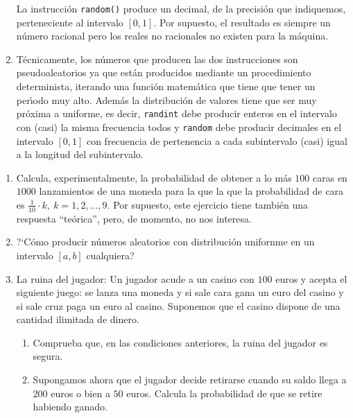 \begin{enumerate}
La instrucci\'on {\tt random()} produce un decimal, de la precisi\'on que
indiquemos,  perteneciente al  intervalo $[0,1]$. Por supuesto, el resultado es
siempre un n\'umero racional pero los reales no racionales no existen para la
m\'aquina. 
 \item T\'ecnicamente, los n\'umeros que producen las dos instrucciones son {\sc
pseudoaleatorios} ya que est\'an producidos mediante un procedimiento
determinista, iterando una funci\'on matem\'atica que tiene que tener un
per\'{\i}odo muy alto. Adem\'as la distribuci\'on de valores tiene que ser muy
pr\'oxima a uniforme, es decir, {\tt randint} debe producir enteros en el
intervalo con (casi) la misma frecuencia todos y {\tt random} debe producir
decimales en el intervalo $[0,1]$ con  frecuencia de pertenencia a cada
subintervalo (casi) igual a la longitud del subintervalo.
 \end{enumerate}
 
 
 


 \begin{ejer}\label{simu}
 
 \begin{enumerate}
 \item Calcula, experimentalmente, la probabilidad de obtener a lo m\'as $100$
caras en $1000$ lanzamientos de una moneda para la que la que la probabilidad de
cara es $\frac{1}{10}\cdot k,\ k=1,2,\dots,9.$  Por supuesto, este ejercicio
tiene tambi\'en una respuesta ``te\'orica'', pero, de momento, no nos interesa.
 \item ?`C\'omo producir n\'umeros aleatorios con distribuci\'on unifornme en un
intervalo $[a,b]$ cualquiera?
 
 
 \item {\sc La ruina del jugador:} Un jugador acude a un casino con $100$ euros
y acepta el siguiente juego: se lanza una moneda y si sale cara gana un euro del
casino y si sale cruz paga un euro al casino. Suponemos que el casino dispone de
una cantidad ilimitada de dinero.
 
 \begin{enumerate}
  \item Comprueba que, en las condiciones anteriores, la ruina del jugador es
segura. 
  \item Supongamos ahora que el jugador decide retirarse  cuando su saldo llega
a $200$ euros o bien a $50$ euros. Calcula la probabilidad de que se retire
habiendo ganado.
  
  
  
 \end{enumerate}
\end{enumerate}
 \end{ejer}
 

